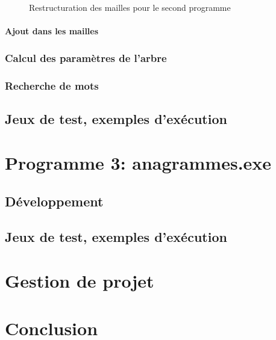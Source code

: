 \documentclass{article} %
\begin{document}
\begin{figure}[H]
  \begin{center}
  \end{center}
  \caption{Restructuration des mailles pour le second programme}
  \label{fig:restruc_pro2}
\end{figure}

\paragraph{Ajout dans les mailles}
\subsubsection{Calcul des paramètres de l'arbre}
\subsubsection{Recherche de mots}

\subsection{Jeux de test, exemples d'exécution}



\section{Programme 3: anagrammes.exe}
\subsection{Développement}
\subsection{Jeux de test, exemples d'exécution}



\section{Gestion de projet}
\section{Conclusion}



\nocite{*}



\end{document}
